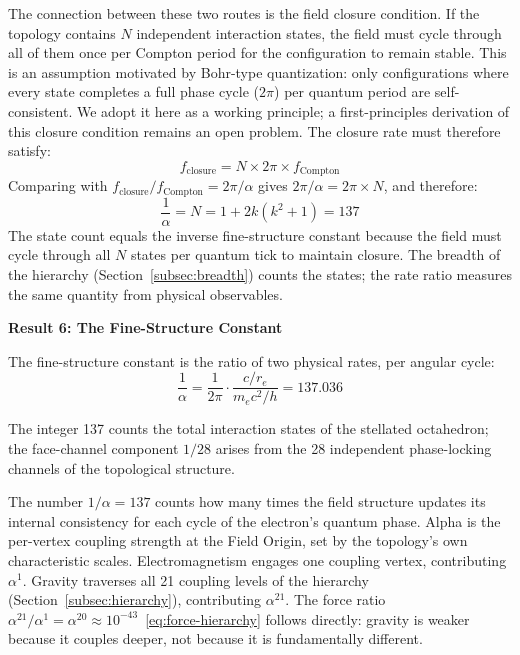 \documentclass[aps,prd,preprint,superscriptaddress,showpacs,preprintnumbers,amsmath,amssymb,nofootinbib]{revtex4-2}
\begin{document}
The connection between these two routes is the field closure condition. If the topology contains $N$ independent interaction states, the field must cycle through all of them once per Compton period for the configuration to remain stable. This is an assumption motivated by Bohr-type quantization: only configurations where every state completes a full phase cycle ($2\pi$) per quantum period are self-consistent. We adopt it here as a working principle; a first-principles derivation of this closure condition remains an open problem. The closure rate must therefore satisfy:
\begin{equation*}
f_{\text{closure}} = N \times 2\pi \times f_{\text{Compton}}
\end{equation*}
Comparing with $f_{\text{closure}}/f_{\text{Compton}} = 2\pi/\alpha$ gives $2\pi/\alpha = 2\pi \times N$, and therefore:
\begin{equation}
\frac{1}{\alpha} = N = 1 + 2k(k^2 + 1) = 137
\label{eq:alpha-integer}
\end{equation}
The state count equals the inverse fine-structure constant because the field must cycle through all $N$ states per quantum tick to maintain closure. The breadth of the hierarchy (Section~\ref{subsec:breadth}) counts the states; the rate ratio measures the same quantity from physical observables.

\vspace{1.5em}
\noindent
\colorbox{resultgreen}{\parbox{\dimexpr\textwidth-2\fboxsep\relax}{%
\vspace{0.8em}
\centering
\textbf{\large Result 6: The Fine-Structure Constant}

\vspace{0.5em}
The fine-structure constant is the ratio of two physical rates, per angular cycle:
\boldmath
\begin{equation}
\frac{1}{\alpha} = \frac{1}{2\pi} \cdot \frac{c/r_e}{m_e c^2/h} = 137.036
\end{equation}
\unboldmath

\vspace{0.3em}
The integer 137 counts the total interaction states of the stellated octahedron; the face-channel component $1/28$ arises from the 28 independent phase-locking channels of the topological structure.
\vspace{0.5em}
}}
\vspace{1cm}

The number $1/\alpha = 137$ counts how many times the field structure updates its internal consistency for each cycle of the electron's quantum phase. Alpha is the per-vertex coupling strength at the Field Origin, set by the topology's own characteristic scales. Electromagnetism engages one coupling vertex, contributing $\alpha^1$. Gravity traverses all 21 coupling levels of the hierarchy (Section~\ref{subsec:hierarchy}), contributing $\alpha^{21}$. The force ratio $\alpha^{21}/\alpha^1 = \alpha^{20} \approx 10^{-43}$~\eqref{eq:force-hierarchy} follows directly: gravity is weaker because it couples deeper, not because it is fundamentally different.
\end{document}
